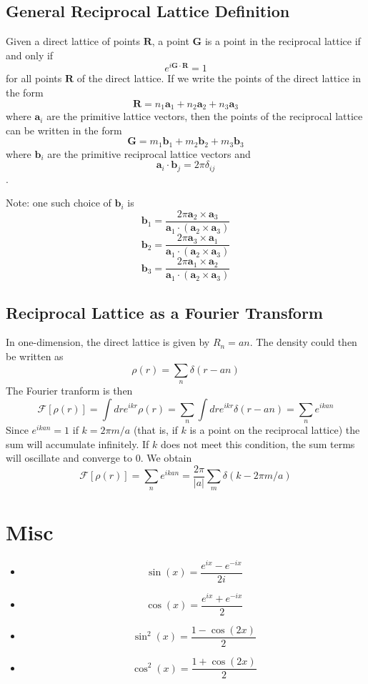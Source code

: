 \documentclass[10pt]{article}
\begin{document}
\subsection{General Reciprocal Lattice Definition}
Given a direct lattice of points $\textbf{R}$, a point $\textbf{G}$ is a point in the reciprocal lattice if and only if
\begin{equation}
  \boxed{e^{i\textbf{G}\cdot \textbf{R}} = 1}
\end{equation}
for all points $\textbf{R}$ of the direct lattice. If we write the points of the direct lattice in the form
$$
\textbf{R} = n_{1}\textbf{a}_{1} + n_{2}\textbf{a}_{2} + n_{3}\textbf{a}_{3}
$$
where $\textbf{a}_{i}$ are the primitive lattice vectors, then the points of the reciprocal lattice can be written in
the form
$$
\textbf{G} = m_{1}\textbf{b}_{1} + m_{2}\textbf{b}_{2} + m_{3}\textbf{b}_{3}
$$
where $\textbf{b}_{i}$ are the primitive reciprocal lattice vectors and $$\textbf{a}_{i}\cdot\textbf{b}_{j} = 2\pi \delta_{ij}$$.


Note: one such choice of $\textbf{b}_{i}$ is
$$
\textbf{b}_{1} = \frac{2\pi \textbf{a}_{2} \times \textbf{a}_{3}}{\textbf{a}_{1} \cdot (\textbf{a}_{2} \times \textbf{a}_{3})}
$$
$$
\textbf{b}_{2} = \frac{2\pi \textbf{a}_{3} \times \textbf{a}_{1}}{\textbf{a}_{1} \cdot (\textbf{a}_{2} \times \textbf{a}_{3})}
$$
$$
\textbf{b}_{3} = \frac{2\pi \textbf{a}_{1} \times \textbf{a}_{2}}{\textbf{a}_{1} \cdot (\textbf{a}_{2} \times \textbf{a}_{3})}
$$

\subsection{Reciprocal Lattice as a Fourier Transform}
In one-dimension, the direct lattice is given by $R_{n} = an$. The density could then be written as
$$\rho(r) = \sum_{n}\delta(r - an)$$
The Fourier tranform is then
$$\mathcal{F}[\rho(r)] = \int dr e^{ikr} \rho(r) = \sum_{n} \int dr e^{ikr} \delta(r-an) = \sum_{n}e^{ikan}$$
Since $e^{ikan} = 1$ if $k = 2\pi m/a$ (that is, if $k$ is a point on the reciprocal lattice) the sum will accumulate infinitely. If $k$ does not meet this condition, the sum terms
will oscillate and converge to 0. We obtain
$$\mathcal{F}[\rho(r)] = \sum_{n}e^{ikan} = \frac{2\pi}{|a|}\sum_{m}\delta(k - 2 \pi m/ a)$$

\section{Misc}
\begin{itemize}
  \item $$\sin(x) = \frac{e^{ix} - e^{-ix}}{2i}$$
  \item $$\cos(x) = \frac{e^{ix} + e^{-ix}}{2}$$
  \item $$\sin^{2}(x) = \frac{1 - \cos(2x)}{2}$$
  \item $$\cos^{2}(x) = \frac{1 + \cos(2x)}{2}$$
\end{itemize}
\end{document}
